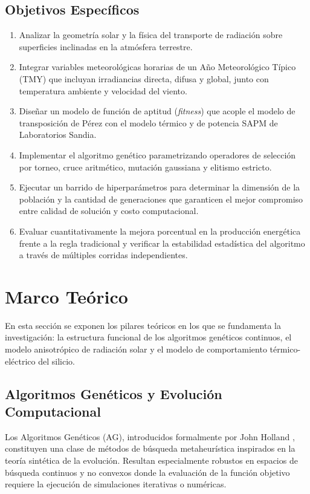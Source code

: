 \documentclass[12pt, a4paper, twocolumn]{article}
\begin{document}
\subsection{Objetivos Específicos}
\begin{enumerate}
  \item Analizar la geometría solar y la física del transporte de radiación sobre superficies inclinadas en la atmósfera terrestre.
  \item Integrar variables meteorológicas horarias de un Año Meteorológico Típico (TMY) que incluyan irradiancias directa, difusa y global, junto con temperatura ambiente y velocidad del viento.
  \item Diseñar un modelo de función de aptitud (\textit{fitness}) que acople el modelo de transposición de Pérez con el modelo térmico y de potencia SAPM de Laboratorios Sandia.
  \item Implementar el algoritmo genético parametrizando operadores de selección por torneo, cruce aritmético, mutación gaussiana y elitismo estricto.
  \item Ejecutar un barrido de hiperparámetros para determinar la dimensión de la población y la cantidad de generaciones que garanticen el mejor compromiso entre calidad de solución y costo computacional.
  \item Evaluar cuantitativamente la mejora porcentual en la producción energética frente a la regla tradicional y verificar la estabilidad estadística del algoritmo a través de múltiples corridas independientes.
\end{enumerate}

\section{Marco Teórico}
En esta sección se exponen los pilares teóricos en los que se fundamenta la investigación: la estructura funcional de los algoritmos genéticos continuos, el modelo anisotrópico de radiación solar y el modelo de comportamiento térmico-eléctrico del silicio.

\subsection{Algoritmos Genéticos y Evolución Computacional}
Los Algoritmos Genéticos (AG), introducidos formalmente por John Holland \cite{holland1975adaptation}, constituyen una clase de métodos de búsqueda metaheurística inspirados en la teoría sintética de la evolución. Resultan especialmente robustos en espacios de búsqueda continuos y no convexos donde la evaluación de la función objetivo requiere la ejecución de simulaciones iterativas o numéricas.
\end{document}
